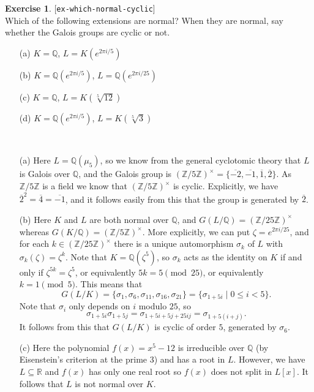 \documentclass{amsart}
\newcommand{\Z}         {{\mathbb{Z}}}
\newcommand{\Q}         {{\mathbb{Q}}}
\newcommand{\R}         {{\mathbb{R}}}
\newcommand{\zt}        {\zeta}
\newcommand{\sg}        {\sigma}
\newcommand{\ov}[1]     {\overline{#1}}
\newcommand{\st}        {\;|\;}
\newcommand{\tm}        {\times}
\newcommand{\sse}       {\subseteq}
\renewcommand{\:}{\colon}
\newcommand{\lastexlabel}{}
\newcommand{\exlabel}[1]{
 \global\def\lastexlabel{#1}\label{#1}[\texttt{#1}]\ \\
}
\newcommand{\exlabel}[1]{
 \global\def\lastexlabel{#1}\label{#1}
}
\newenvironment{solution}{\SolutionInline}{\endSolutionInline}
\theoremstyle{definition}
\newtheorem{exercise}{Exercise}[section]
\renewenvironment{solution}{\SolutionAtEnd}{\endSolutionAtEnd}
\begin{document}
\begin{exercise}\exlabel{ex-which-normal-cyclic}
 Which of the following extensions are normal? When they are normal,
 say whether the Galois groups are cyclic or not.
 \begin{itemize}
  \item[(a)] $K=\Q$, $L=K(e^{{2\pi i}/{5}})$
  \item[(b)] $K=\Q(e^{{2\pi i}/{5}})$, $L=\Q(e^{{2\pi i}/{25}})$
  \item[(c)] $K=\Q$, $L=K(\sqrt[5]{12})$
  \item[(d)] $K=\Q(e^{{2\pi i}/{5}})$, $L=K(\sqrt[5]{3})$
 \end{itemize}
\end{exercise}
\begin{solution}\ \\
 \begin{itemize}
  \item[(a)] Here $L=\Q(\mu_5)$, so we know from the general
   cyclotomic theory that $L$ is Galois over $\Q$, and the Galois
   group is $(\Z/5\Z)^\tm=\{\ov{-2},\ov{-1},\ov{1},\ov{2}\}$.  As
   $\Z/5\Z$ is a field we know that $(\Z/5\Z)^\tm$ is cyclic.
   Explicitly, we have $\ov{2}^2=\ov{4}=\ov{-1}$, and it follows
   easily from this that the group is generated by $\ov{2}$.

  \item[(b)] Here $K$ and $L$ are both normal over $\Q$, and
   $G(L/\Q)=(\Z/25\Z)^{\tm}$ whereas $G(K/\Q)=(\Z/5\Z)^\tm$.  More
   explicitly, we can put $\zt=e^{2\pi i/25}$, and for each
   $k\in(\Z/25\Z)^\tm$ there is a unique automorphism $\sg_k$ of $L$
   with $\sg_k(\zt)=\zt^k$.  Note that $K=\Q(\zt^5)$, so $\sg_k$ acts
   as the identity on $K$ if and only if $\zt^{5k}=\zt^5$, or
   equivalently $5k=5\pmod{25}$, or equivalently $k=1\pmod{5}$.  This
   means that 
   \[ G(L/K) = \{\sg_1,\sg_6,\sg_{11},\sg_{16},\sg_{21}\} = 
       \{\sg_{1+5i}\st 0\leq i<5\}.
   \]
   Note that $\sg_i$ only depends on $i$ modulo $25$, so 
   \[ \sg_{1+5i}\sg_{1+5j} = \sg_{1+5i+5j+25ij} = \sg_{1+5(i+j)}. \]
   It follows from this that $G(L/K)$ is cyclic of order $5$,
   generated by $\sg_6$.

  \item[(c)] Here the polynomial $f(x)=x^5-12$ is irreducible over
   $\Q$ (by Eisenstein's criterion at the prime $3$) and has a root in
   $L$.  However, we have $L\sse\R$ and $f(x)$ has only one real root
   so $f(x)$ does not split in $L[x]$.  It follows that $L$ is not
   normal over $K$.


\end{itemize}
\end{solution}
\end{document}
